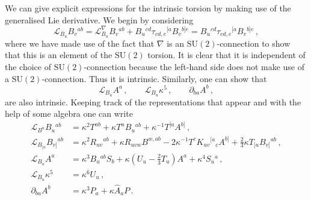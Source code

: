 \documentclass{PoS}
\newcommand{\SU}[1]{\mathrm{SU}( #1 )}
\newcommand{\gL}{\mathcal{L}}
\newcommand{\hA}{\hat{A}}
\begin{document}
We can give explicit expressions for the intrinsic torsion by making use of the generalised Lie derivative. We begin by considering
\begin{equation}
 \gL_{B_u} B_v{}^{ab} = \gL_{B_u}^\nabla B_v{}^{ab} + B_u{}^{cd} \tau_{cd,e}{}^{[a} B_v{}^{b]e} = B_u{}^{cd} \tau_{cd,e}{}^{[a} B_v{}^{b]e} \,,
\end{equation}
where we have made use of the fact that $\nabla$ is an $\SU{2}$-connection to show that this is an element of the $\SU{2}$ torsion. It is clear that it is independent of the choice of $\SU{2}$-connection because the left-hand side does not make use of a $\SU{2}$-connection. Thus it is intrinsic. Similarly, one can show that
\begin{equation}
 \gL_{B_u} A^a \,, \qquad \gL_{B_u} \kappa^5 \,, \qquad \partial_{ba} A^b \,,
\end{equation}
are also intrinsic. Keeping track of the representations that appear and with the help of some algebra one can write \cite{Malek:2017njj}
\begin{equation}
 \begin{split}
  \gL_{B^u} B_u{}^{ab} &= \kappa^2 T^{ab} + \kappa T^u B_u{}^{ab} + \kappa^{-1} T^{[a} A^{b]} \,, \\
  \gL_{B_{[u}} B_{v]}{}^{ab} &= \kappa^2 R_{uv}{}^{ab} + \kappa R_{uvw} B^{w,ab} - 2 \kappa^{-1} T^c K_{uv}{}^{[a}{}_c A^{b]} + \frac23 \kappa T_{[u} B_{v]}{}^{ab} \,, \\
  \gL_{B_u} A^a &= \kappa^3 B_u{}^{ab} S_b + \kappa \left( U_u - \frac23 T_u \right) A^a + \kappa^4 S_u{}^a \,, \\
  \gL_{B_u} \kappa^5 &= \kappa^6 U_u \,, \\
  \partial_{ba} A^b &= \kappa^3 P_a + \kappa \hA_a P \,.
 \end{split}
\end{equation}
\end{document}
